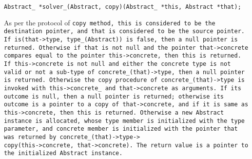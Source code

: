 
\tt{Abstract_ *solver_(Abstract, copy)(Abstract_ *this, Abstract *that);}


As per the protocol of \tt{copy} method, \tt{this} is considered to be the
destination pointer, and \tt{that} is considered to be the source pointer.
If \tt{is(that->type, type_(Abstract))} is
\tt{false}, then a null pointer is returned.
Otherwise if \tt{that} is not null and the pointer \tt{that->concrete}
compares equal to the pointer \tt{this->concrete}, then \tt{this} is returned.
If \tt{this->concrete} is not null and either the concrete \tt{type} is not valid
or not a sub-type of \tt{concrete_(that)->type}, then a null pointer is returned.
Otherwise the \tt{copy} procedure of \tt{concrete_(that)->type} is
invoked with \tt{this->concrete_} and \tt{that->concrete} as arguments.
If its outcome is null, then a null pointer is returned;
otherwise its outcome is a pointer to a copy of \tt{that->concrete},
and if it is same as \tt{this->concrete}, then \tt{this} is returned.
Otherwise a new \tt{Abstract} instance is allocated, whose \tt{type}
member is initialized with the \tt{type} parameter, and \tt{concrete}
member is initialized with the pointer that was returned by
\tt{concrete_(that)->type->}\\\tt{copy(this->concrete, that->concrete)}.
The return value is a pointer to the initialized \tt{Abstract} instance.
